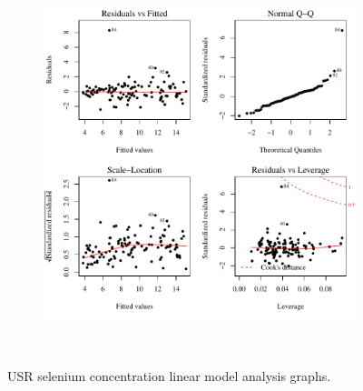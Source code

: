 \subfiguremid
\begin{landscape}
	\begin{figure}
		\begin{subfigure}{0.7\textwidth}
			\centering
			\includegraphics[width=\tableCustomSize]{"Figures/Results_USR/Stochastic/Conc Model lm-fit UDIV"}
		\end{subfigure}\\
		\caption{USR selenium concentration linear model analysis graphs.}
	\end{figure}
\end{landscape}

